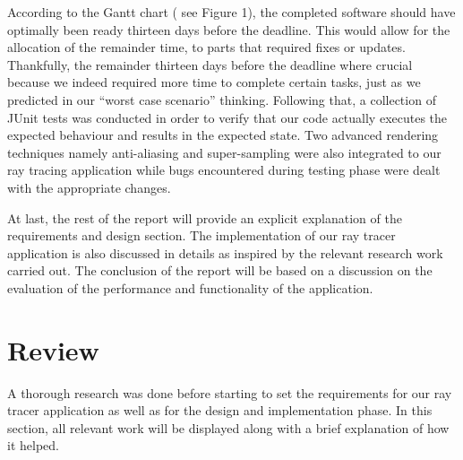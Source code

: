 \documentclass[11pt,a4paper]{article}
\begin{document}
According to the Gantt chart ( see Figure 1), the completed software should have optimally been ready thirteen days before the deadline. This would allow for the allocation of the remainder time, to parts that required fixes or updates. Thankfully, the remainder thirteen days before the deadline where crucial because we indeed required more time to complete certain tasks, just as we predicted in our “worst case scenario” thinking. Following that, a collection of JUnit tests was conducted in order to verify that our code actually executes the expected behaviour and results in the expected state. Two advanced rendering techniques namely anti-aliasing and super-sampling were also integrated to our ray tracing application while bugs encountered during testing phase were dealt with the appropriate changes.

At last, the rest of the report will provide an explicit explanation of the requirements and design section. The implementation of our ray tracer application is also discussed in details as inspired by the relevant research work carried out. The conclusion of the report will be based on a discussion on the evaluation of the performance and functionality of the application.

\section{Review}
A thorough research was done before starting to set the requirements for our ray tracer application as well as for the design and implementation phase. In this section, all relevant work will be displayed along with a brief explanation of how it helped.
\end{document}

